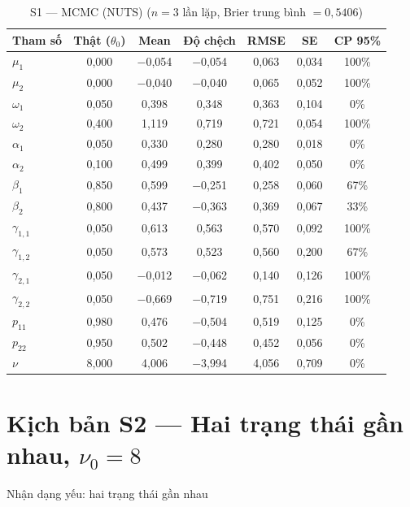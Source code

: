 \documentclass[11pt,a4paper]{article}
\begin{document}
\begin{table}[H]\centering\scriptsize
\caption{S1 --- MCMC (NUTS) ($n=3$ lần lặp, Brier trung bình $=0{,}5406$)}
\begin{tabularx}{\textwidth}{l C C C C C C}
\toprule
\textbf{Tham số} & \textbf{Thật ($\theta_0$)} & \textbf{Mean} & \textbf{Độ chệch} & \textbf{RMSE} & \textbf{SE} & \textbf{CP 95\%} \\
\midrule
$\mu_1$ & 0{,}000 & $-$0{,}054 & $-$0{,}054 & 0{,}063 & 0{,}034 & 100\% \\
$\mu_2$ & 0{,}000 & $-$0{,}040 & $-$0{,}040 & 0{,}065 & 0{,}052 & 100\% \\
$\omega_1$ & 0{,}050 & 0{,}398 & 0{,}348 & 0{,}363 & 0{,}104 & 0\% \\
$\omega_2$ & 0{,}400 & 1{,}119 & 0{,}719 & 0{,}721 & 0{,}054 & 100\% \\
$\alpha_1$ & 0{,}050 & 0{,}330 & 0{,}280 & 0{,}280 & 0{,}018 & 0\% \\
$\alpha_2$ & 0{,}100 & 0{,}499 & 0{,}399 & 0{,}402 & 0{,}050 & 0\% \\
$\beta_1$ & 0{,}850 & 0{,}599 & $-$0{,}251 & 0{,}258 & 0{,}060 & 67\% \\
$\beta_2$ & 0{,}800 & 0{,}437 & $-$0{,}363 & 0{,}369 & 0{,}067 & 33\% \\
$\gamma_{1,1}$ & 0{,}050 & 0{,}613 & 0{,}563 & 0{,}570 & 0{,}092 & 100\% \\
$\gamma_{1,2}$ & 0{,}050 & 0{,}573 & 0{,}523 & 0{,}560 & 0{,}200 & 67\% \\
$\gamma_{2,1}$ & 0{,}050 & $-$0{,}012 & $-$0{,}062 & 0{,}140 & 0{,}126 & 100\% \\
$\gamma_{2,2}$ & 0{,}050 & $-$0{,}669 & $-$0{,}719 & 0{,}751 & 0{,}216 & 100\% \\
$p_{11}$ & 0{,}980 & 0{,}476 & $-$0{,}504 & 0{,}519 & 0{,}125 & 0\% \\
$p_{22}$ & 0{,}950 & 0{,}502 & $-$0{,}448 & 0{,}452 & 0{,}056 & 0\% \\
$\nu$ & 8{,}000 & 4{,}006 & $-$3{,}994 & 4{,}056 & 0{,}709 & 0\% \\
\bottomrule
\end{tabularx}
\end{table}

\bigskip
\section*{Kịch bản S2 --- Hai trạng thái gần nhau, $\nu_0=8$}
Nhận dạng yếu: hai trạng thái gần nhau
\end{document}
